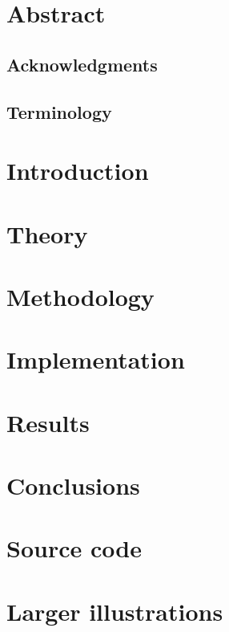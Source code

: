 \documentclass[12pt]{report}
\begin{document}
\pagestyle{fancy}
\fancyhead{}
\fancyhead[R]{\today}
\fancyfoot[C]{\thepage}

\chapter*{\hspace*{42pt}\Huge{Abstract}}
    

\newpage

\section*{\hspace*{42pt}\Huge{Acknowledgments}}
    
\newpage
{
\sffamily\tableofcontents
}
\newpage
\section*{\hspace*{42pt}\Huge{Terminology}}
    

\newpage
{}
\chapter{Introduction}
    
    \newpage
\chapter{Theory}
    
    \newpage
\chapter{Methodology}
    
    \newpage
\chapter{Implementation}
    
    \newpage
\chapter{Results}
    
    \newpage
\chapter{Conclusions}
    


\newpage
\renewcommand{\bibname}{References}
 


\appendix
\begin{appendices}
  \chapter{Source code}
  
  \chapter{Larger illustrations}
  
\end{appendices}
\end{document}
